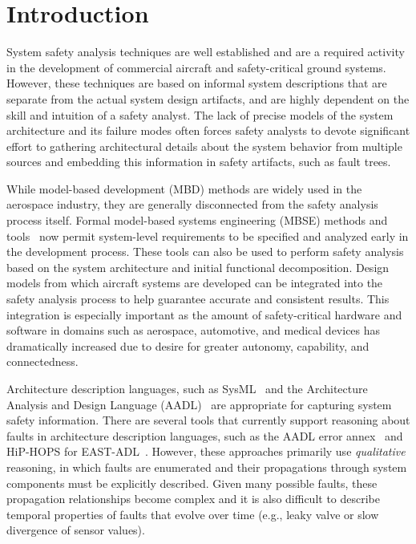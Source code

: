 \section{Introduction}

System safety analysis techniques are well established and are a required activity in the development of commercial aircraft and safety-critical ground systems. However, these techniques are based on informal system descriptions that are separate from the actual system design artifacts, and are highly dependent on the skill and intuition of a safety analyst. The lack of precise models of the system architecture and its failure modes often forces safety analysts to devote significant effort to gathering architectural details about the system behavior from multiple sources and embedding this information in safety artifacts, such as fault trees.

While model-based development (MBD) methods are widely used in the aerospace industry, they are generally disconnected from the safety analysis process itself. Formal model-based systems engineering (MBSE) methods and tools~\cite{QFCS15:backes,hilt2013,NFM2012:CoGaMiWhLaLu,DBLP:journals/scp/CimattiT15,Pajic2012,DBLP:conf/adaEurope/SokolskyLC09} now permit system-level requirements to be specified and analyzed early in the development process. These tools can also be used to perform safety analysis based on the system architecture and initial functional decomposition. Design models from which aircraft systems are developed can be integrated into the safety analysis process to help guarantee accurate and consistent results. This integration is especially important as the amount of safety-critical hardware and software in domains such as aerospace, automotive, and medical devices has dramatically increased due to desire for greater autonomy, capability, and connectedness.

Architecture description languages, such as SysML~\cite{SysML} and the Architecture Analysis and Design Language (AADL)~\cite{AADL} are appropriate for capturing system safety information.  There are several tools that currently support reasoning about faults in architecture description languages, such as the AADL error annex~\cite{Larson:2013:IAE:2527269.2527271} and HiP-HOPS for EAST-ADL~\cite{CHEN201391}.  However, these approaches primarily use {\em qualitative} reasoning, in which faults are enumerated and their propagations through system components must be explicitly described.  Given many possible faults, these propagation relationships become complex and it is also difficult to describe temporal properties of faults that evolve over time (e.g., leaky valve or slow divergence of sensor values).


